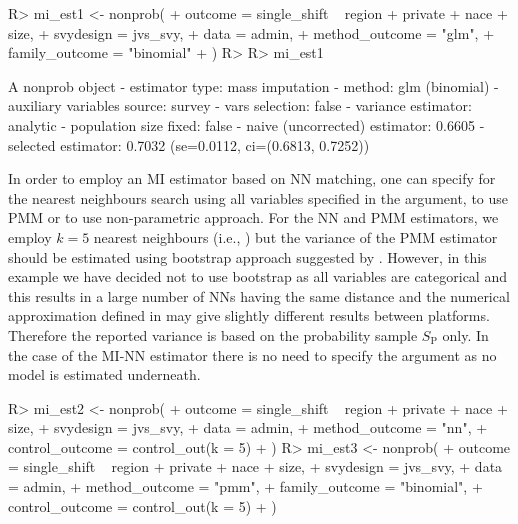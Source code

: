 \documentclass[
]{jss}
\begin{document}
\begin{CodeChunk}
\begin{CodeInput}
R> mi_est1 <- nonprob(
+   outcome = single_shift ~ region + private + nace + size,
+   svydesign = jvs_svy,
+   data = admin,
+   method_outcome = "glm",
+   family_outcome = "binomial"
+ )
R> 
R> mi_est1
\end{CodeInput}
\begin{CodeOutput}
A nonprob object
 - estimator type: mass imputation
 - method: glm (binomial)
 - auxiliary variables source: survey
 - vars selection: false
 - variance estimator: analytic
 - population size fixed: false
 - naive (uncorrected) estimator: 0.6605
 - selected estimator: 0.7032 (se=0.0112, ci=(0.6813, 0.7252))
\end{CodeOutput}
\end{CodeChunk}

In order to employ an MI estimator based on NN matching, one can specify
 for the nearest neighbours search using
all variables specified in the  argument,
 to use PMM or
 to use non-parametric approach. For the
NN and PMM estimators, we employ \(k=5\) nearest neighbours (i.e.,
) but the variance of the PMM estimator should
be estimated using bootstrap approach suggested by
\citet{chlebicki2025}. However, in this example we have decided not to
use bootstrap as all variables are categorical and this results in a
large number of NNs having the same distance and the numerical
approximation defined in  may give slightly
different results between platforms. Therefore the reported variance is
based on the probability sample \(S_{\text{P}}\) only. In the case of
the MI-NN estimator there is no need to specify the
 argument as no model is estimated underneath.

\begin{CodeChunk}
\begin{CodeInput}
R> mi_est2 <- nonprob(
+   outcome = single_shift ~ region + private + nace + size,
+   svydesign = jvs_svy,
+   data = admin,
+   method_outcome = "nn",
+   control_outcome = control_out(k = 5)
+ )
R> mi_est3 <- nonprob(
+   outcome = single_shift ~ region + private + nace + size,
+   svydesign = jvs_svy,
+   data = admin,
+   method_outcome = "pmm",
+   family_outcome = "binomial", 
+   control_outcome = control_out(k = 5)
+ )
\end{CodeInput}
\end{CodeChunk}
\end{document}

